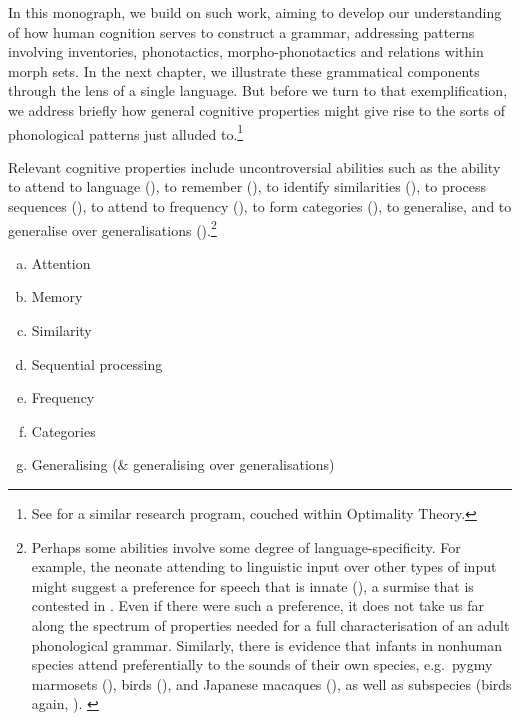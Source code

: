 In this monograph, we build on such work, aiming to develop our understanding of how human cognition serves to construct a grammar, addressing patterns involving inventories, phonotactics, morpho-phonotactics and relations within morph sets. In the next chapter, we illustrate these grammatical components through the lens of a single language. But before we turn to that exemplification, we address briefly how general cognitive properties might give rise to the sorts of phonological patterns just alluded to.\footnote{See \citet{Weijer:2009, vandeWeijer:2012, Weijer:2014, Weijer:2017, Weijer:2019} for a similar research program, couched within Optimality Theory.}


\largerpage[-2]
Relevant cognitive properties include uncontroversial abilities such as the ability to attend to language (\citealt{Pena+:2003}), to remember (\citealt{Meltzoff:1988}), to identify similarities  (\citealt{Goldstone:1994}), to process sequences (\citealt{Conway+:2001}), to attend to frequency (\citealt{Tenenbaum+:2001, Thiessen+:2015}), to form categories (\citealt{Ashby+:2005, Ashby+:2011}), to generalise, and to generalise over generalisations (\citealt{Deacon:1997, Gomez+:2000, Saffran+:2007}).\footnote{Perhaps some abilities involve some degree of language-specificity. For example, the neonate attending to linguistic input over other types of input might suggest a preference for speech that is innate (\citealt{Pena+:2003}), a surmise that is contested in \citet{Lacerda:2003}. Even if there were such a preference, it does not take us far along the spectrum of properties needed for a full characterisation of an adult phonological grammar. Similarly, there is evidence that infants in nonhuman species attend preferentially to the sounds of their own species, e.g.\ pygmy marmosets (\citealt{Snowdon+:1978}), birds (\citealt{Whaling:2000}), and Japanese macaques (\citealt{Adachi+:2006}), as well as subspecies (birds again, \citealt{Nelson:2000}). \label{species-preference}} 


\begin{example}  \label{cognitive_primitives}
    \begin{enumerate}[a.]
    \item {Attention}\label{attention}
    \item {Memory}\label{memory}
    \item {Similarity}\label{similarity}
    \item {Sequential processing}\label{sequential-processing}
    \item {Frequency}\label{frequency}
    \item {Categories}\label{categories}
    \item {Generalising} (\& generalising over generalisations)\label{generalising}
    \end{enumerate}
\end{example}

